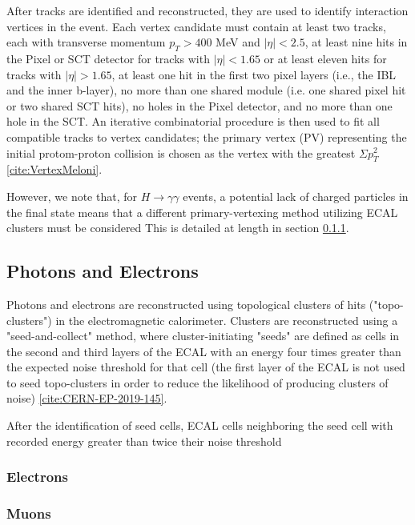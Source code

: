 After tracks are identified and reconstructed, they are used to identify interaction vertices in the event. Each vertex candidate must contain at least two tracks, each with transverse momentum $p_{T} > 400$ MeV and $|\eta|<2.5$, at least nine hits in the Pixel or SCT detector for tracks with $|\eta|<1.65$ or at least eleven hits for tracks with $|\eta|>1.65$, at least one hit in the first two pixel layers (i.e., the IBL and the inner b-layer), no more than one shared module (i.e. one shared pixel hit or two shared SCT hits), no holes in the Pixel detector, and no more than one hole in the SCT. An iterative combinatorial procedure is then used to fit all compatible tracks to vertex candidates; the primary vertex (PV) representing the initial protom-proton collision is chosen as the vertex with the greatest $\Sigma p_{T}^{2}$ \ref{cite:VertexMeloni}.

However, we note that, for $H \rightarrow \gamma \gamma$ events, a potential lack of charged particles in the final state means that a different primary-vertexing method utilizing ECAL clusters must be considered This is detailed at length in section \ref{sec:Photons}.


\subsection{Photons and Electrons} \label{sec:Photons} 

Photons and electrons are reconstructed using topological clusters of hits ("topo-clusters") in the electromagnetic calorimeter. Clusters are reconstructed using a "seed-and-collect" method, where cluster-initiating "seeds" are defined as cells in the second and third layers of the ECAL with an energy four times greater than the expected noise threshold for that cell (the first layer of the ECAL is not used to seed topo-clusters in order to reduce the likelihood of producing clusters of noise) \ref{cite:CERN-EP-2019-145}.

After the identification of seed cells, ECAL cells neighboring the seed cell with recorded energy greater than twice their noise threshold

\subsubsection{Electrons} \label{sec:Photons} 


\subsubsection{Muons} \label{sec:Muons} 


